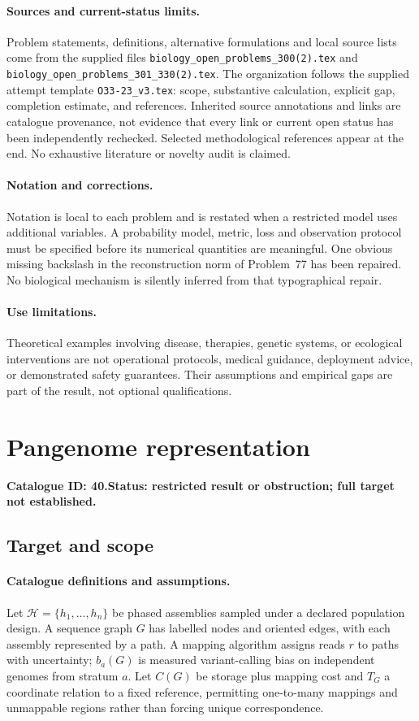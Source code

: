 \documentclass[11pt]{article}
\begin{document}
\paragraph{Sources and current-status limits.}
Problem statements, definitions, alternative formulations and local source lists
come from the supplied files
\texttt{biology\_open\_problems\_300(2).tex} and
\texttt{biology\_open\_problems\_301\_330(2).tex}.
The organization follows the supplied attempt template
\texttt{O33-23\_v3.tex}: scope, substantive calculation, explicit gap,
completion estimate, and references. Inherited source annotations and links are
catalogue provenance, not evidence that every link or current open status has
been independently rechecked. Selected methodological references appear at the
end. No exhaustive literature or novelty audit is claimed.

\paragraph{Notation and corrections.}
Notation is local to each problem and is restated when a restricted model uses
additional variables. A probability model, metric, loss and observation protocol
must be specified before its numerical quantities are meaningful. One obvious
missing backslash in the reconstruction norm of Problem~77 has been repaired.
No biological mechanism is silently inferred from that typographical repair.

\paragraph{Use limitations.}
Theoretical examples involving disease, therapies, genetic systems, or ecological
interventions are not operational protocols, medical guidance, deployment advice,
or demonstrated safety guarantees. Their assumptions and empirical gaps are part
of the result, not optional qualifications.

\setcounter{section}{39}
\section{Pangenome representation}
\label{prob:040}
\noindent\textbf{Catalogue ID: 40.}\quad \textbf{Status: restricted result or obstruction; full target not established.}
\subsection{Target and scope}
\paragraph{Catalogue definitions and assumptions.}
Let $\mathcal H=\{h_1,\ldots,h_n\}$ be phased assemblies sampled under a declared population design. A sequence graph $G$ has labelled nodes and oriented edges, with each assembly represented by a path. A mapping algorithm assigns reads $r$ to paths with uncertainty; $b_a(G)$ is measured variant-calling bias on independent genomes from stratum $a$. Let $C(G)$ be storage plus mapping cost and $T_G$ a coordinate relation to a fixed reference, permitting one-to-many mappings and unmappable regions rather than forcing unique correspondence.
\end{document}

